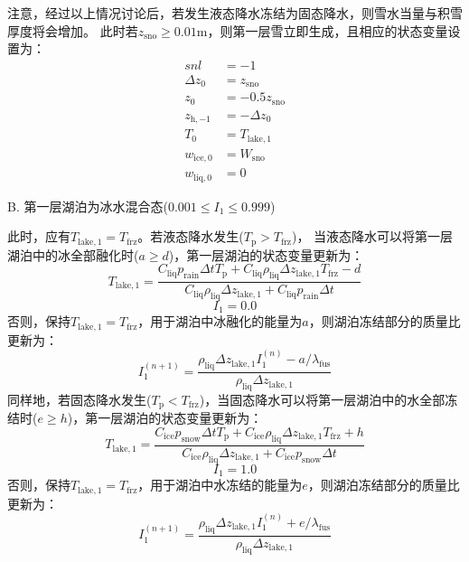 注意，经过以上情况讨论后，若发生液态降水冻结为固态降水，则雪水当量与积雪厚度将会增加。
此时若$z_{\mathrm{sno}}\geqslant 0.01$m，则第一层雪立即生成，且相应的状态变量设置为：
\begin{equation}
  \begin{aligned}
    snl &= -1 \\
    \Delta z_{0} &= z_{\mathrm{sno}} \\
    z_{0} &= -0.5 z_{\mathrm{sno}} \\
    z_{\mathrm{h,-1}} &= -\Delta z_{0} \\
    T_{0} &= T_{\mathrm{lake, 1}} \\
    w_{\mathrm{ice, 0}} &= W_{\mathrm{sno}} \\
    w_{\mathrm{liq, 0}} &= 0
  \end{aligned}
\end{equation}

B. 第一层湖泊为冰水混合态($0.001\leqslant I_1\leqslant 0.999$)

此时，应有$T_{\mathrm{lake,1}}=T_{\mathrm {frz}} $。若液态降水发生($T_{\mathrm {p}} >T_{\mathrm {frz}} $)，
当液态降水可以将第一层湖泊中的冰全部融化时($a\geqslant d$)，第一层湖泊的状态变量更新为：
\begin{equation}
  T_{\mathrm{lake, 1}}=\frac{C_{\mathrm{liq}} p_{\mathrm {rain}} \Delta t T_{\mathrm{p}}+C_{\mathrm{liq}} \rho_{\mathrm{liq}} \Delta z_{\mathrm{lake, 1}} T_{\mathrm {frz}}-d}{C_{\mathrm{liq}} \rho_{\mathrm{liq}} \Delta z_{\mathrm{lake, 1}}+C_{\mathrm{liq}} p_{\mathrm {rain}} \Delta t}
\end{equation}
\begin{equation}
  I_{1}=0.0
\end{equation}
否则，保持$T_{\mathrm{lake,1}}=T_{\mathrm {frz}} $，用于湖泊中冰融化的能量为$a$，则湖泊冻结部分的质量比更新为：
\begin{equation}
  I_{1}^{(n+1)}=\frac{\rho_{\mathrm{liq}} \Delta z_{\mathrm{lake, 1}} I_{1}^{(n)}-a / \lambda_{\mathrm {fus}}}{\rho_{\mathrm{liq}} \Delta z_{\mathrm{lake, 1}}}
\end{equation}
同样地，若固态降水发生($T_{\mathrm {p}} <T_{\mathrm {frz}} $)，当固态降水可以将第一层湖泊中的水全部冻结时($e\geqslant h$)，第一层湖泊的状态变量更新为：
\begin{equation}
  T_{\mathrm{lake, 1}}=\frac{C_{\mathrm{ice}} p_{\mathrm {snow}} \Delta t T_{\mathrm{p}}+C_{\mathrm{ice}} \rho_{\mathrm{liq}} \Delta z_{\mathrm{lake, 1}} T_{\mathrm {frz}}+h}{C_{\mathrm{ice}} \rho_{\mathrm{liq}} \Delta z_{\mathrm{lake, 1}}+C_{\mathrm{ice}} p_{\mathrm {snow}} \Delta t}
\end{equation}
\begin{equation}
  I_{1}=1.0
\end{equation}
否则，保持$T_{\mathrm{lake,1}}=T_{\mathrm {frz}} $，用于湖泊中水冻结的能量为$e$，则湖泊冻结部分的质量比更新为：
\begin{equation}
  I_{1}^{(n+1)}=\frac{\rho_{\mathrm{liq}} \Delta z_{\mathrm{lake, 1}} I_{1}^{(n)}+e / \lambda_{\mathrm {fus}}}{\rho_{\mathrm{liq}} \Delta z_{\mathrm{lake, 1}}}
\end{equation}

